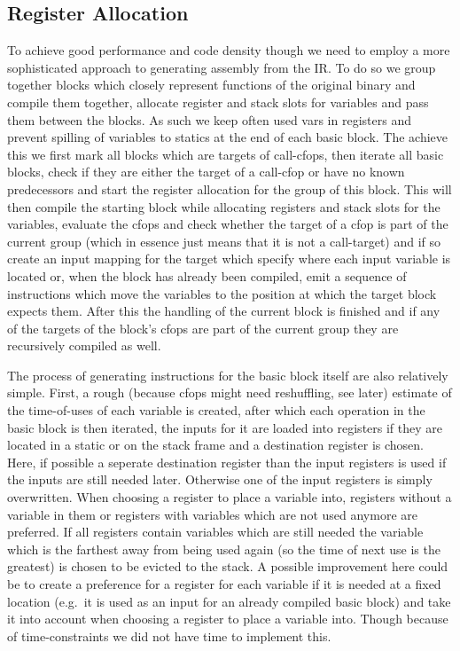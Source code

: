 \documentclass[course=eragp]{aspdoc}
\begin{document}
\subsection{Register Allocation}\label{reg_alloc}
To achieve good performance and code density though we need to employ a more sophisticated approach to generating assembly from the IR.
To do so we group together blocks which closely represent functions of the original binary and compile them together, allocate register and stack slots
for variables and pass them between the blocks. As such we keep often used vars in registers and prevent spilling of variables to statics at the end of each basic block.
The achieve this we first mark all blocks which are targets of call-cfops, then iterate all basic blocks, check if they are either the target of a call-cfop or have no known predecessors
and start the register allocation for the group of this block.
This will then compile the starting block while allocating registers and stack slots for the variables, evaluate the cfops and check whether the target of a cfop is part of the current group
(which in essence just means that it is not a call-target) and if so create an input mapping for the target which specify where each input variable is located or, when the block has already been compiled,
emit a sequence of instructions which move the variables to the position at which the target block expects them.
After this the handling of the current block is finished and if any of the targets of the block's cfops are part of the current group they are recursively compiled as well.

\par

The process of generating instructions for the basic block itself are also relatively simple. First, a rough (because cfops might need reshuffling, see later) estimate of the time-of-uses of each variable is created,
after which each operation in the basic block is then iterated, the inputs for it are loaded into registers if they are located in a static or on the stack frame and a destination register is chosen.
Here, if possible a seperate destination register than the input registers is used if the inputs are still needed later. Otherwise one of the input registers is simply overwritten.
When choosing a register to place a variable into, registers without a variable in them or registers
with variables which are not used anymore are preferred. If all registers contain variables which
are still needed
the variable which is the farthest away from being used again (so the time of next use is the greatest) is chosen to be evicted to the stack.
A possible improvement here could be to create a preference for a register for each variable if it is needed at a fixed location (e.g.\ it is used as an input for an already compiled basic block)
and take it into account when choosing a register to place a variable into. Though because of
time-constraints we did not have time to implement this.
\end{document}
